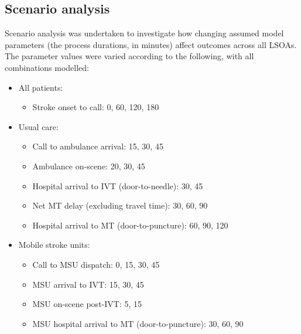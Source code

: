 \subsection{Scenario analysis}

Scenario analysis was undertaken to investigate how changing assumed model parameters (the process durations, in minutes) affect outcomes across all LSOAs. The parameter values were varied according to the following, with all combinations modelled:

\begin{minipage}{1.0\textwidth}  %
\begin{spacing}{1.2}
\begin{itemize}
    \item All patients:
    \begin{itemize}
        \item Stroke onset to call: 0, 60, 120, 180
    \end{itemize}
    \item Usual care:
    \begin{itemize}
        \item Call to ambulance arrival: 15, 30, 45
        \item Ambulance on-scene: 20, 30, 45
        \item Hospital arrival to IVT (door-to-needle): 30, 45
        \item Net MT delay (excluding travel time): 30, 60, 90
        \item Hospital arrival to MT (door-to-puncture): 60, 90, 120
    \end{itemize}
    \item Mobile stroke units:
    \begin{itemize}
        \item Call to MSU dispatch: 0, 15, 30, 45
        \item MSU arrival to IVT: 15, 30, 45
        \item MSU on-scene post-IVT: 5, 15
        \item MSU hospital arrival to MT (door-to-puncture): 30, 60, 90
    \end{itemize}
\end{itemize}
\end{spacing}
\end{minipage}

